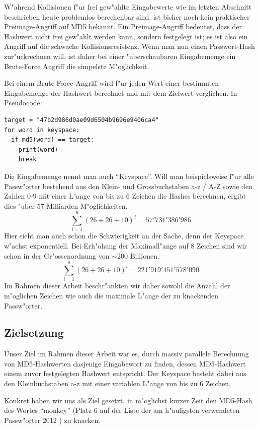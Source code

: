 \begin{refsection}
W"ahrend Kollisionen f"ur frei gew"ahlte Eingabewerte wie im letzten Abschnitt
beschrieben heute problemlos berechenbar sind, ist bisher noch kein praktischer
Preimage-Angriff auf MD5 bekannt. Ein Preimage-Angriff bedeutet, dass der
Hashwert nicht frei gew"ahlt werden kann, sondern festgelegt ist; es ist also
ein Angriff auf die schwache Kollisionsresistenz. Wenn man nun einen
Passwort-Hash zur"uckrechnen will, ist daher bei einer "uberschaubaren
Eingabemenge ein Brute-Force Angriff die simpelste M"oglichkeit.

Bei einem Brute Force Angriff wird f"ur jeden Wert einer bestimmten
Eingabemenge der Hash\-wert berechnet und mit dem Zielwert verglichen. In
Pseudocode:

\begin{verbatim}
target = "47b2d986d0ae09d6504b9696e9406ca4"
for word in keyspace:
  if md5(word) == target:
    print(word)
    break
\end{verbatim}

\label{crypto:keyspace}
Die Eingabemenge nennt man auch ``Keyspace''. Will man beispielsweise f"ur alle
Passw"orter bestehend aus den Klein- und Grossbuchstaben a-z / A-Z sowie den
Zahlen 0-9 mit einer L"ange von bis zu 6 Zeichen die Hashes berechnen, ergibt
dies "uber 57 Milliarden M"oglichkeiten.
\[
	\sum_{i=1}^{6} \left(26 + 26 + 10\right)^i = 57'731'386'986
\]
Hier sieht man auch schon die Schwierigkeit an der Sache, denn der Keyspace
w"achst exponentiell. Bei Erh"ohung der Maximall"ange auf 8 Zeichen sind wir schon
in der Gr"ossenordnung von $\sim$200 Billionen.
\[
	\sum_{i=1}^{8} \left(26 + 26 + 10\right)^i = 221'919'451'578'090
\]
Im Rahmen dieser Arbeit beschr"ankten wir daher sowohl die Anzahl der m"oglichen
Zeichen wie auch die maximale L"ange der zu knackenden Passw"orter.

\subsection{Zielsetzung}
\label{crypto:zielsetzung}

Unser Ziel im Rahmen dieser Arbeit war es, durch massiv parallele Berechnung von
MD5-Hashwerten dasjenige Eingabewort zu finden, dessen MD5-Hashwert einem zuvor
festgelegten Hashwert entspricht. Der Keyspace besteht dabei aus den
Kleinbuchstaben a-z mit einer variablen L"ange von bis zu 6 Zeichen.

Konkret haben wir uns als Ziel gesetzt, in m"oglichst kurzer Zeit den MD5-Hash
des Wortes ``monkey'' (Platz 6 auf der Liste der am h"aufigsten verwendeten
Passw"orter 2012 \cite{crypto:splash2012}) zu knacken.


\end{refsection}
